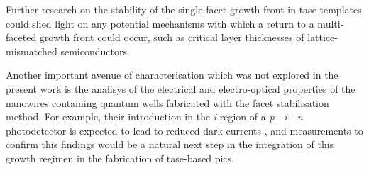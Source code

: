 Further research on the stability of the single-facet growth front in \acs{tase} templates could shed light on any potential mechanisms with which a return to a multi-faceted growth front could occur, such as critical layer thicknesses of lattice-mismatched semiconductors.

Another important avenue of characterisation which was not explored in the present work is the analisys of the electrical and electro-optical properties of the nanowires containing quantum wells fabricated with the facet stabilisation method. For example, their introduction in the \textit{i} region of a \textit{p} - \textit{i} - \textit{n} photodetector is expected to lead to reduced dark currents \cite{Xue2021}, and measurements to confirm this findings would be a natural next step in the integration of this growth regimen in the fabrication of \acs{tase}-based \acs{pic}s.